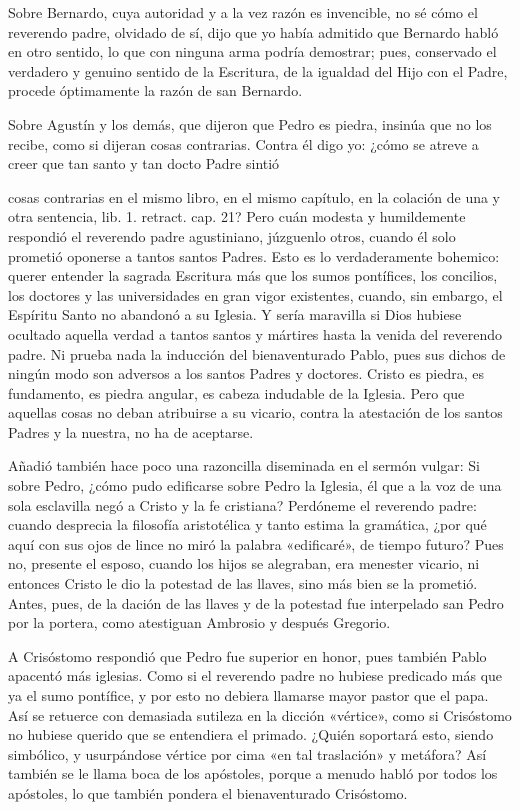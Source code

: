\marginpar{\small[282]} Sobre Bernardo, cuya autoridad y a la vez razón es invencible, no sé cómo el reverendo padre, olvidado de sí, dijo que yo había admitido que Bernardo habló en otro sentido, lo que con ninguna arma podría demostrar; pues, conservado el verdadero y genuino sentido de la Escritura, de la igualdad del Hijo con el Padre, procede óptimamente la razón de san Bernardo.

Sobre Agustín y los demás, que dijeron que Pedro es piedra, insinúa que no los recibe, como si dijeran cosas contrarias. Contra él digo yo: ¿cómo se atreve a creer que tan santo y tan docto Padre sintió

cosas contrarias en el mismo libro, en el mismo capítulo, en la colación de una y otra sentencia, lib. 1. retract. cap. 21? Pero cuán modesta y humildemente respondió el reverendo padre agustiniano, júzguenlo otros, cuando él solo prometió oponerse a tantos santos Padres. Esto es lo verdaderamente bohemico: querer entender la sagrada Escritura más que los sumos pontífices, los concilios, los doctores y las universidades en gran vigor existentes, cuando, sin embargo, el Espíritu Santo no abandonó a su Iglesia. Y sería maravilla si Dios hubiese ocultado aquella verdad a tantos santos y mártires hasta la venida del reverendo padre. Ni prueba nada la inducción del bienaventurado Pablo, pues sus dichos de ningún modo son adversos a los santos Padres y doctores. Cristo es piedra, es fundamento, es piedra angular, es cabeza indudable de la Iglesia. Pero que aquellas cosas no deban atribuirse a su vicario, contra la atestación de los santos Padres y la nuestra, no ha de aceptarse.

Añadió también hace poco una razoncilla diseminada en el sermón vulgar: Si sobre Pedro, ¿cómo pudo edificarse sobre Pedro la Iglesia, él que a la voz de una sola esclavilla negó a Cristo y la fe cristiana? Perdóneme el reverendo padre: cuando desprecia la filosofía aristotélica y tanto estima la gramática, ¿por qué aquí con sus ojos de lince no miró la palabra «edificaré», de tiempo futuro? Pues no, presente el esposo, cuando los hijos se alegraban, era menester vicario, ni entonces Cristo le dio la potestad de las llaves, sino más bien se la prometió. Antes, pues, de la dación de las llaves y de la potestad fue interpelado san Pedro por la portera, como atestiguan Ambrosio y después Gregorio.

A Crisóstomo respondió que Pedro fue superior en honor, pues también Pablo apacentó más iglesias. Como si el reverendo padre no hubiese predicado más que ya el sumo pontífice, y por esto no debiera llamarse mayor pastor que el papa. Así se retuerce con demasiada sutileza en la dicción «vértice», como si Crisóstomo no hubiese querido que se entendiera el primado. ¿Quién soportará esto, siendo simbólico, y usurpándose vértice por cima «en tal traslación» y metáfora? Así también se le llama boca de los apóstoles, porque a menudo habló por todos los apóstoles, lo que también pondera el bienaventurado Crisóstomo.

